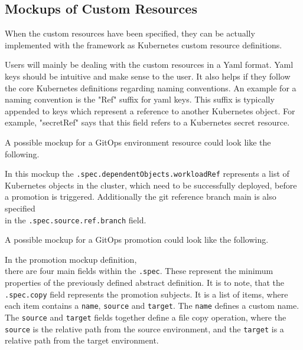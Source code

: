 \subsection{Mockups of Custom Resources}
\label{prototype:design:mockups-custom-resources}


When the custom resources have been specified,
they can be actually implemented with the framework
as Kubernetes custom resource definitions.

Users will mainly be dealing with the custom resources in a Yaml format.
Yaml keys should be intuitive and make sense to the user.
It also helps if they follow the core Kubernetes definitions regarding naming conventions.
An example for a naming convention is the "Ref" suffix for yaml keys.
This suffix is typically appended to keys which represent a reference to another Kubernetes
object.
For example, "secretRef" says that this field refers to a Kubernetes secret resource.

A possible mockup for a GitOps environment resource
could look like the following.



In this mockup the \lstinline|.spec.dependentObjects.workloadRef|
represents a list of Kubernetes objects in the cluster,
which need to be successfully deployed,
before a promotion is triggered.
Additionally the git reference branch main is also specified \\
in the \lstinline|.spec.source.ref.branch| field.

A possible mockup for a GitOps promotion 
could look like the following.



In the promotion mockup definition,\\
there are four main fields within the \lstinline|.spec|.
These represent the minimum properties of the previously defined abstract definition.
It is to note, that
the \lstinline|.spec.copy| field represents the promotion subjects.
It is a list of items, where each item contains
a \lstinline|name|, \lstinline|source| and \lstinline|target|.
The \lstinline|name| defines a custom name.
The \lstinline|source| and \lstinline|target| fields together define a
file copy operation,
where the \lstinline|source| is the relative path from the source environment,
and the \lstinline|target| is a relative path from the target environment.

